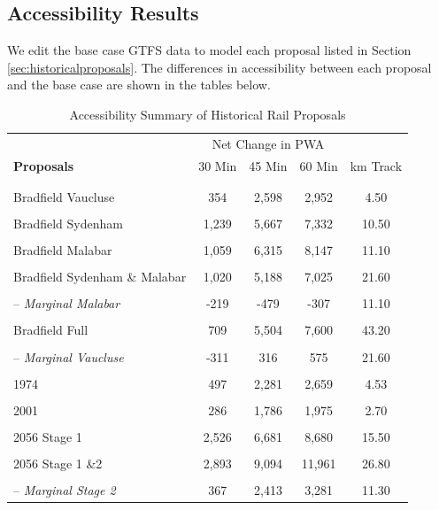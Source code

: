 \documentclass[preprint,12pt,authoryear]{elsarticle}
\begin{document}
\subsection{Accessibility Results}
We edit the base case GTFS data to model each proposal listed in Section \ref{sec:historicalproposals}. The differences in accessibility between each proposal and the base case are shown in the tables below.
\begin{table}[H]
\centering
 
\caption{Accessibility Summary of Historical Rail Proposals}\label{heavy rail accessibility}

\begin{tabular}{p{4cm}cccc}
    \toprule 
    & \multicolumn{3}{c}{Net Change in PWA}& \\


    \textbf{Proposals}& 30 Min& 45 Min& 60 Min &km Track \\
 & & & & \\
    \midrule
 & & &  & \\
 Bradfield Vaucluse& 354& 2,598&2,952&4.50
 \\
 & & & & \\
 Bradfield Sydenham& 1,239& 5,667& 7,332&10.50
 \\
 & & & & \\
 Bradfield Malabar& 1,059& 6,315& 8,147&11.10
 \\
 & & & & \\
 Bradfield Sydenham \& Malabar& 1,020& 5,188& 7,025&21.60
 \\
 & & & & \\
 -- \textit{Marginal Malabar}& -219& -479&-307&11.10
 \\
 & & & & \\
 Bradfield Full& 709& 5,504& 7,600&43.20
 \\
 & & & & \\
 -- \textit{Marginal Vaucluse}& -311& 316&575&21.60
 \\
 & & & & \\
 1974 & 497& 2,281& 2,659&4.53
 \\
 & & & & \\
 2001 & 286& 1,786& 1,975&2.70
 \\
 & & & & \\
 2056 Stage 1 & 2,526& 6,681& 8,680&15.50
 \\
 & & & & \\
 2056 Stage 1 \&2 & 2,893& 9,094& 11,961&26.80
 \\
 & & & & \\
 -- \textit{Marginal Stage 2}& 367& 2,413& 3,281&11.30
 \\
     \bottomrule
\end{tabular}
\end{table}
\end{document}
